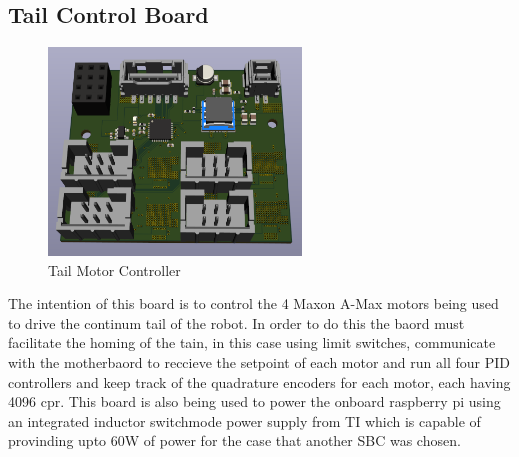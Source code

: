 \subsection{Tail Control Board}
\begin{figure}[H]
       \centering
       \includegraphics[width=0.6\textwidth]{figures/TailControllerBoard.png}
       \caption{Tail Motor Controller}
       \label{fig:TailControlBoardPCB}
   \end{figure}
   The intention of this board is to control the 4 Maxon A-Max motors being used to drive the continum tail of the robot. In order to do this the baord must facilitate the homing of the tain, in this case using limit switches, communicate with the motherbaord to reccieve the setpoint of each motor and run all four PID controllers and keep track of the quadrature encoders for each motor, each having 4096 cpr. This board is also being used to power the onboard raspberry pi using an integrated inductor switchmode power supply from TI which is capable of provinding upto 60W of power for the case that another SBC was chosen. 
   
